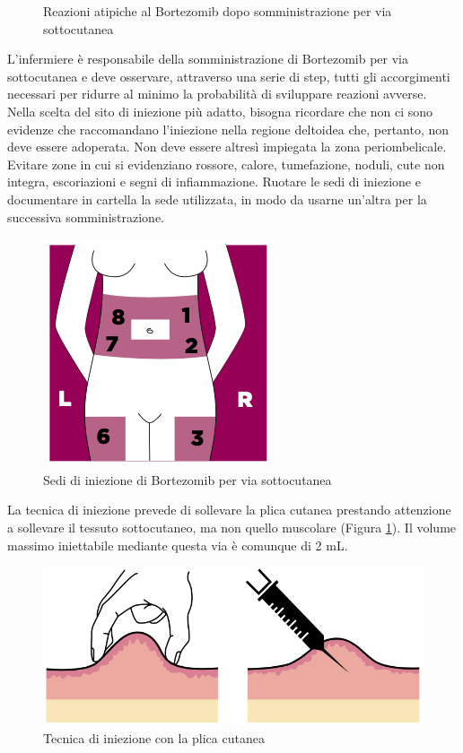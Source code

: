 \begin{figure}[H]
\begin{center}
\begin{subfigure}[b]{0.7\textwidth}
    
        \end{subfigure}
    \end{center} 
    \caption{Reazioni atipiche al Bortezomib dopo somministrazione per via sottocutanea\cite{BORTEZOMIB}}
    
\end{figure}

L’infermiere è responsabile della somministrazione di Bortezomib per via sottocutanea e deve osservare,
attraverso una serie di step, tutti gli accorgimenti necessari per ridurre al minimo la probabilità di sviluppare 
reazioni avverse.\\ 
Nella scelta del sito di iniezione più adatto, bisogna ricordare che non ci sono evidenze che raccomandano l’iniezione 
nella regione deltoidea che, pertanto, non deve essere adoperata. Non deve essere altresì impiegata la zona periombelicale.
Evitare zone in cui si evidenziano rossore, calore, 
tumefazione, noduli, cute non integra, escoriazioni e segni di infiammazione. 
Ruotare le sedi di iniezione e documentare in cartella la sede utilizzata, in modo da usarne 
un’altra per la successiva somministrazione\cite{BORTNURSES}.

\begin{figure}[H]
    \begin{center}
    \includegraphics[width=0.3\columnwidth]{img/SEDI.png}
    \vspace{-3mm}
    \end{center}
    \caption{ Sedi di iniezione di Bortezomib per via sottocutanea
    \cite{BORTEZOMIB}}

\end{figure}

La tecnica di iniezione prevede di sollevare la plica cutanea prestando attenzione a sollevare il tessuto 
sottocutaneo, ma non quello muscolare (Figura \ref{fig:FIGURE_3.6}). 
Il volume massimo iniettabile mediante questa via è comunque di 2 mL.

\begin{figure}[H]
    \begin{center}
    \includegraphics[width=0.5\columnwidth]{img/PLICA.png}
    \vspace{-3mm}
    \end{center}
    \caption{ Tecnica di iniezione con la plica cutanea
    \cite{BORTEZOMIB}}
    \label{fig:FIGURE_3.6}
\end{figure}

